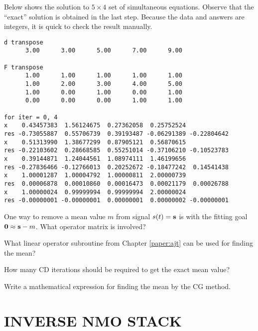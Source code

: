 \par
Below shows the solution to $5 \times 4$ set of simultaneous equations.
Observe that the ``exact'' solution is obtained in the last step.
Because the data and answers are integers,
it is quick to check the result manually.
\par
\noindent
\footnotesize
\begin{verbatim}
d transpose
      3.00      3.00      5.00      7.00      9.00

F transpose
      1.00      1.00      1.00      1.00      1.00
      1.00      2.00      3.00      4.00      5.00
      1.00      0.00      1.00      0.00      1.00
      0.00      0.00      0.00      1.00      1.00

for iter = 0, 4
x    0.43457383  1.56124675  0.27362058  0.25752524
res -0.73055887  0.55706739  0.39193487 -0.06291389 -0.22804642
x    0.51313990  1.38677299  0.87905121  0.56870615
res -0.22103602  0.28668585  0.55251014 -0.37106210 -0.10523783
x    0.39144871  1.24044561  1.08974111  1.46199656
res -0.27836466 -0.12766013  0.20252672 -0.18477242  0.14541438
x    1.00001287  1.00004792  1.00000811  2.00000739
res  0.00006878  0.00010860  0.00016473  0.00021179  0.00026788
x    1.00000024  0.99999994  0.99999994  2.00000024
res -0.00000001 -0.00000001  0.00000001  0.00000002 -0.00000001
\end{verbatim}
\normalsize

\begin{exer}
\item
One way to remove a mean value $m$ from signal $s(t)= \bold s$
is with the fitting goal $\bold 0 \approx \bold s - m$.
What operator matrix is involved?
\item
What linear operator subroutine from Chapter \ref{paper:ajt}
can be used for finding the mean?
\item
How many CD iterations should be required to get the exact mean value?
\item
Write a mathematical expression for finding the mean by the CG method.
\end{exer}


\section{INVERSE NMO STACK}

